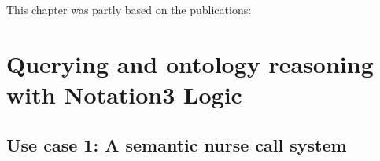 \documentclass[11pt,a4paper,twoside]{book}
\begin{document}

\vspace{0.3cm}




\newpage
This chapter was partly based on the publications:
\vspace{0.3cm}


\vspace{0.3cm}



%






\chapter{Querying and ontology reasoning with Notation3 Logic}\label{others}

\section{Use case 1: A semantic nurse call system}\label{orca}

% 
% 

\label{validation}
\end{document}
